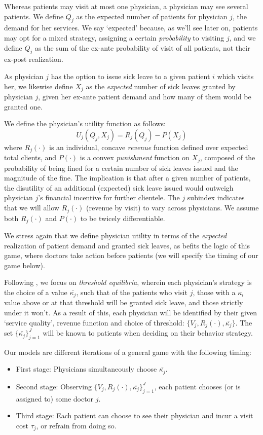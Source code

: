 \documentclass[../main.tex]{subfiles}
\begin{document}
Whereas patients may visit at most one physician, a physician may see several patients. We define $Q_j$ as the expected number of patients for physician $j$, the demand for her services. We say `expected' because, as we'll see later on, patients may opt for a mixed strategy, assigning a certain \textit{probability} to visiting $j$, and we define $Q_j$ as the sum of the ex-ante probability of visit of all patients, not their ex-post realization.

As physician $j$ has the option to issue sick leave to a given patient $i$ which visits her, we likewise define $X_j$ as the \textit{expected} number of sick leaves granted by physician $j$, given her ex-ante patient demand and how many of them would be granted one.

We define the physician's utility function as follows:
\[
U_j(Q_j, X_j) = R_j(Q_j) - P(X_j)
\]
where $R_j(\cdot)$ is an individual, concave \textit{revenue} function defined over expected total clients, and $P(\cdot)$ is a convex \textit{punishment} function on $X_j$, composed of the probability of being fined for a certain number of sick leaves issued and the magnitude of the fine. The implication is that after a given number of patients, the disutility of an additional (expected) sick leave issued would outweigh physician $j$'s financial incentive for further clientele. The $j$ subindex indicates that we will allow $R_j(\cdot)$ (revenue by visit) to vary across physicians. We assume both $R_j(\cdot)$ and $P(\cdot)$ to be twicely differentiable.

We stress again that we define physician utility in terms of the \textit{expected} realization of patient demand and granted sick leaves, as befits the logic of this game, where doctors take action before patients (we will specify the timing of our game below).

Following \cite{schnell2017physician}, we focus on \textit{threshold equilibria}, wherein each physician's strategy is the choice of a value $\bar{\kappa_j}$, such that of the patients who visit $j$, those with a $\kappa_i$ value above or at that threshold will be granted sick leave, and those strictly under it won't. As a result of this, each physician will be identified by their given `service quality', revenue function and choice of threshold: $\{V_j,R_j(\cdot),\bar{\kappa_j}\}$. The set $\{\bar{\kappa_j}\}_{j=1}^{J}$ will be known to patients when deciding on their behavior strategy.

Our models are different iterations of a general game with the following timing:
\begin{itemize}[itemsep=-1pt, topsep=0pt]
    \item First stage: Physicians simultaneously choose $\bar{\kappa_j}$.
    \item Second stage: Observing $\{V_j,R_j(\cdot),\bar{\kappa_j}\}_{j =1}^{J}$, each patient chooses (or is assigned to) some doctor $j$.
    \item Third stage: Each patient can choose to see their physician and incur a visit cost $\tau_j$, or refrain from doing so.
\end{itemize}
\end{document}
